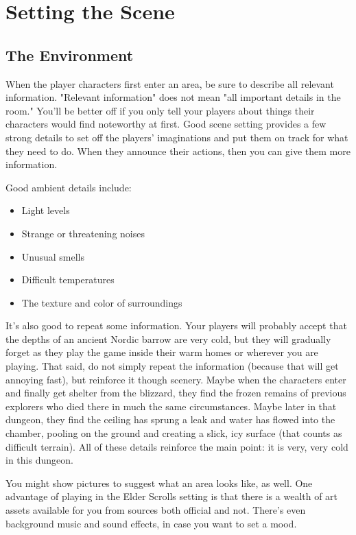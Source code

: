 \documentclass[12pt]{book}
\begin{document}
\section{Setting the Scene}

\subsection{The Environment}
When the player characters first enter an area, be sure to describe all relevant information. "Relevant information" does not mean "all important details in the room." You'll be better off if you only tell your players about things their characters would find noteworthy at first. Good scene setting provides a few strong details to set off the players' imaginations and put them on track for what they need to do. When they announce their actions, then you can give them more information.

Good ambient details include:

\begin{itemize}
	\item Light levels
	\item Strange or threatening noises
	\item Unusual smells
	\item Difficult temperatures
	\item The texture and color of surroundings
\end{itemize}

It's also good to repeat some information. Your players will probably accept that the depths of an ancient Nordic barrow are very cold, but they will gradually forget as they play the game inside their warm homes or wherever you are playing. That said, do not simply repeat the information (because that will get annoying fast), but reinforce it though scenery. Maybe when the characters enter and finally get shelter from the blizzard, they find the frozen remains of previous explorers who died there in much the same circumstances. Maybe later in that dungeon, they find the ceiling has sprung a leak and water has flowed into the chamber, pooling on the ground and creating a slick, icy surface (that counts as difficult terrain). All of these details reinforce the main point: it is very, very cold in this dungeon.

You might show pictures to suggest what an area looks like, as well. One advantage of playing in the Elder Scrolls setting is that there is a wealth of art assets available for you from sources both official and not. There's even background music and sound effects, in case you want to set a mood.
\end{document}
